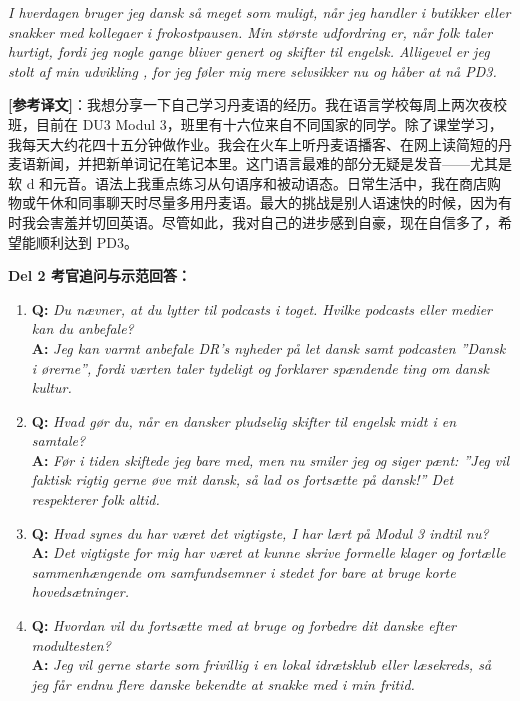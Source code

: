 \begin{answerbox}
\vspace{0.18em}
\textit{I hverdagen bruger jeg dansk så meget som muligt, når jeg handler i butikker eller snakker med kollegaer i frokostpausen. Min største udfordring  er, når folk taler hurtigt, fordi jeg nogle gange bliver genert og skifter til engelsk. Alligevel er jeg stolt af min udvikling , for jeg føler mig mere selvsikker nu og håber at nå PD3.}

\vspace{0.2em}
\small\textbf{[参考译文]}：我想分享一下自己学习丹麦语的经历。我在语言学校每周上两次夜校班，目前在 DU3 Modul 3，班里有十六位来自不同国家的同学。除了课堂学习，我每天大约花四十五分钟做作业。我会在火车上听丹麦语播客、在网上读简短的丹麦语新闻，并把新单词记在笔记本里。这门语言最难的部分无疑是发音——尤其是软 d 和元音。语法上我重点练习从句语序和被动语态。日常生活中，我在商店购物或午休和同事聊天时尽量多用丹麦语。最大的挑战是别人语速快的时候，因为有时我会害羞并切回英语。尽管如此，我对自己的进步感到自豪，现在自信多了，希望能顺利达到 PD3。

\vspace{0.25em}
\textbf{\color{NCDRed}Del 2 考官追问与示范回答：}
\begin{enumerate}
  \item \textbf{Q:} \textit{Du nævner, at du lytter til podcasts i toget. Hvilke podcasts eller medier kan du anbefale?}\\
  \textbf{A:} \textit{Jeg kan varmt anbefale DR's nyheder på let dansk samt podcasten ”Dansk i ørerne”, fordi værten taler tydeligt og forklarer spændende ting om dansk kultur.}
  \item \textbf{Q:} \textit{Hvad gør du, når en dansker pludselig skifter til engelsk midt i en samtale?}\\
  \textbf{A:} \textit{Før i tiden skiftede jeg bare med, men nu smiler jeg og siger pænt: ”Jeg vil faktisk rigtig gerne øve mit dansk, så lad os fortsætte på dansk!” Det respekterer folk altid.}
  \item \textbf{Q:} \textit{Hvad synes du har været det vigtigste, I har lært på Modul 3 indtil nu?}\\
  \textbf{A:} \textit{Det vigtigste for mig har været at kunne skrive formelle klager og fortælle sammenhængende om samfundsemner i stedet for bare at bruge korte hovedsætninger.}
  \item \textbf{Q:} \textit{Hvordan vil du fortsætte med at bruge og forbedre dit danske efter modultesten?}\\
  \textbf{A:} \textit{Jeg vil gerne starte som frivillig i en lokal idrætsklub eller læsekreds, så jeg får endnu flere danske bekendte at snakke med i min fritid.}
\end{enumerate}
\end{answerbox}

